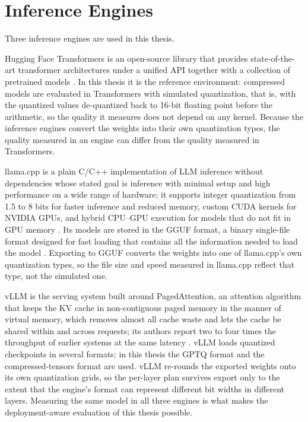 \documentclass[
11pt, %
english, %
singlespacing, %
headsepline, %
]{MastersDoctoralThesis} %
\begin{document}
\section{Inference Engines}
\label{sec:ch2-engines}

Three inference engines are used in this thesis.

Hugging Face Transformers is an open-source library that provides state-of-the-art transformer architectures under a unified API together with a collection of pretrained models \cite{wolf2020transformers}. In this thesis it is the reference environment: compressed models are evaluated in Transformers with simulated quantization, that is, with the quantized values de-quantized back to 16-bit floating point before the arithmetic, so the quality it measures does not depend on any kernel. Because the inference engines convert the weights into their own quantization types, the quality measured in an engine can differ from the quality measured in Transformers.

llama.cpp is a plain C/C++ implementation of LLM inference without dependencies whose stated goal is inference with minimal setup and high performance on a wide range of hardware; it supports integer quantization from 1.5 to 8 bits for faster inference and reduced memory, custom CUDA kernels for NVIDIA GPUs, and hybrid CPU--GPU execution for models that do not fit in GPU memory \cite{ggml2025llamacpp}. Its models are stored in the GGUF format, a binary single-file format designed for fast loading that contains all the information needed to load the model \cite{ggml2025gguf}. Exporting to GGUF converts the weights into one of llama.cpp's own quantization types, so the file size and speed measured in llama.cpp reflect that type, not the simulated one.

vLLM is the serving system built around PagedAttention, an attention algorithm that keeps the KV cache in non-contiguous paged memory in the manner of virtual memory, which removes almost all cache waste and lets the cache be shared within and across requests; its authors report two to four times the throughput of earlier systems at the same latency \cite{kwon2023vllm}. vLLM loads quantized checkpoints in several formats; in this thesis the GPTQ format and the compressed-tensors format are used. vLLM re-rounds the exported weights onto its own quantization grids, so the per-layer plan survives export only to the extent that the engine's format can represent different bit widths in different layers. Measuring the same model in all three engines is what makes the deployment-aware evaluation of this thesis possible.
\end{document}
